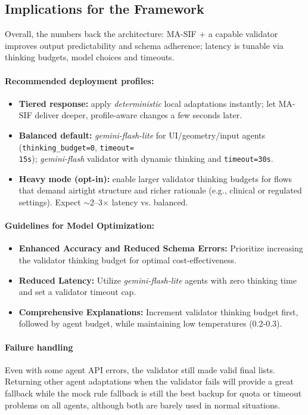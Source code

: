 \subsection*{Implications for the Framework}
Overall, the numbers back the architecture: MA-SIF + a capable validator improves output predictability and schema adherence; latency is tunable via thinking budgets, model choices and timeouts.

\paragraph{Recommended deployment profiles:}
\begin{itemize}
    \item \textbf{Tiered response:} apply \emph{deterministic} local adaptations instantly; let MA-SIF deliver deeper, profile-aware changes a few seconds later.
    \item \textbf{Balanced default:} \emph{gemini-flash-lite} for UI/geometry/input agents (\texttt{thinking\_budget=0}, \texttt{timeout=\\15s}); \emph{gemini-flash} validator with dynamic thinking and \texttt{timeout=30s}.
    \item \textbf{Heavy mode (opt-in):} enable larger validator thinking budgets for flows that demand airtight structure and richer rationale (e.g., clinical or regulated settings). Expect $\sim$2–3$\times$ latency vs. balanced.
\end{itemize}

\paragraph{Guidelines for Model Optimization:}
\begin{itemize}
    \item \textbf{Enhanced Accuracy and Reduced Schema Errors:} Prioritize increasing the validator thinking budget for optimal cost-effectiveness.
    \item \textbf{Reduced Latency:} Utilize \emph{gemini-flash-lite} agents with zero thinking time and set a validator timeout cap.
    \item \textbf{Comprehensive Explanations:} Increment validator thinking budget first, followed by agent budget, while maintaining low temperatures (0.2-0.3).
\end{itemize}

\paragraph{Failure handling}
Even with some agent API errors, the validator still made valid final lists. Returning other agent adaptations when the validator fails will provide a great fallback while the mock rule fallback is still the best backup for quota or timeout problems on all agents, although both are barely used in normal situations.


